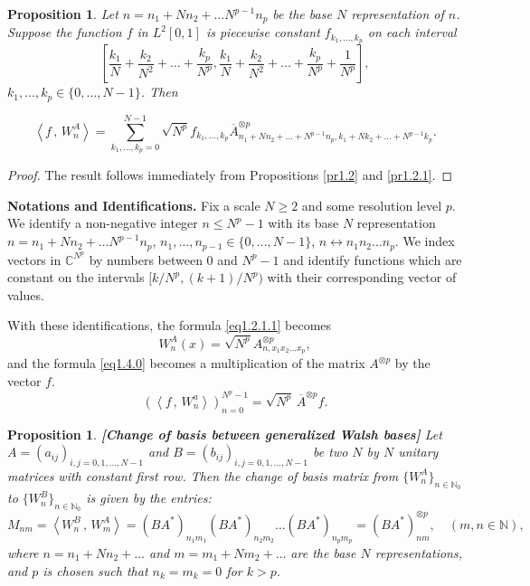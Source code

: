 \documentclass[11pt]{amsart}
\newtheorem{proposition}[theorem]{Proposition}
\theoremstyle{definition}
\theoremstyle{remark}
\numberwithin{equation}{section}
\newcommand{\ip}[2]{\left\langle #1\, , \,#2\right\rangle}
\newcommand{\cj}[1]{\overline{#1}}
\newcommand{\bc}{\mathbb{C}}
\newcommand{\bn}{\mathbb{N}}
\begin{document}
\begin{proposition}\label{pr1.4}
Let $n=n_1+Nn_2+\dots N^{p-1}n_p$ be the base $N$ representation of $n$. Suppose the function $f$ in $L^2[0,1]$ is piecewise constant $f_{k_1,\dots,k_p}$ on each interval $$\left[\frac{k_1}{N}+\frac{k_2}{N^2}+\dots+\frac{k_p}{N^p},\frac{k_1}{N}+\frac{k_2}{N^2}+\dots+\frac{k_p}{N^p}+\frac{1}{N^p}\right],$$ $k_1,\dots,k_p\in\{0,\dots,N-1\}$. Then

\begin{equation}
\ip{f}{W_n^A}=\sum_{k_1,\dots,k_p=0}^{N-1}\sqrt{N^p}f_{k_1,\dots,k_p}\cj A^{\otimes p}_{n_1+Nn_2+\dots+N^{p-1}n_p,k_1+Nk_2+\dots+N^{p-1}k_p}.
\label{eq1.4.0}
\end{equation}



\end{proposition}

\begin{proof}
The result follows immediately from Propositions \ref{pr1.2} and \ref{pr1.2.1}.
\end{proof}


\medskip
{\bf Notations and Identifications.}
Fix a scale $N\geq 2$ and some resolution level $p$. We identify a non-negative integer $n\leq N^p-1$ with its base $N$ representation $n=n_1+Nn_2+\dots N^{p-1}n_p$, $n_1,\dots,n_{p-1}\in\{0,\dots, N-1\}$, $n\leftrightarrow n_1n_2\dots n_p$. We index vectors in $\bc^{N^p}$ by numbers between 0 and $N^p-1$ and identify functions which are constant on the intervals $[k/N^p,(k+1)/N^p)$ with their corresponding vector of values. 


With these identifications, the formula \eqref{eq1.2.1.1} becomes
\begin{equation}
W_n^A(x)=\sqrt{N^p}A^{\otimes p}_{n,x_1x_2\dots x_p},
\label{eq1.4.1}
\end{equation}
and the formula \eqref{eq1.4.0} becomes a multiplication of the matrix $A^{\otimes p}$ by the vector $f$. 
\begin{equation}
(\ip{f}{W_n^a})_{n=0}^{N^p-1}=\sqrt{N^p}\,\cj A^{\otimes p}f.
\label{eq1.4.2}
\end{equation}
\medskip


\begin{proposition}\label{pr1.3}{\bf [Change of basis between generalized Walsh bases]}
Let $A=(a_{ij})_{i,j=0,1,\dots,N-1}$ and $B=(b_{ij})_{i,j=0,1,\dots,N-1}$ be two $N$ by $N$ unitary matrices with constant first row. Then the change of basis matrix from $\{W_n^A\}_{n\in\bn_0}$ to $\{W_n^B\}_{n\in\bn_0}$ is given by the entries:
\begin{equation}
M_{nm}=\ip{W_n^B}{W_m^A}=(BA^*)_{n_1m_1}(BA^*)_{n_2m_2}\dots (BA^*)_{n_pm_p}=(BA^*)^{\otimes p}_{nm},\quad(m,n\in\bn),
\label{eq1.3.1}
\end{equation}
where $n=n_1+Nn_2+\dots$ and $m=m_1+Nm_2+\dots$ are the base $N$ representations, and $p$ is chosen such that $n_k=m_k=0$ for $k>p$.
\end{proposition}
\end{document}
